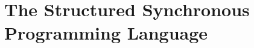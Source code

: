 

\section{The Structured Synchronous Programming Language \CEU}
\label{sec.ceu}

\begin{comment}
- structured programming
- lexical scope

In summary:

Reactive: code executes in reactions to events

Synchronous: reactions run to completion, i.e., there's no implicit preemption or real parallelism (this avoids explicit synchronization: locks, queues, etc)

Structured: programs use structured control mechanisms, such as "await" (to suspend a line of execution), and "par" (to combine multiple awaiting lines of execution)

Structured programming avoids deep nesting of callbacks letting you write programs in direct/sequential style. In addition, when a line of execution is aborted, all allocated resources are safely released.

In comparison to FRP/dataflow, it is more imperative supporting sequences/loops/conditionals/parallels. The notion of (multiple) program counter is explicit. Also, everything is lexically scoped, there's no GC involved.

In comparison to promises/futures, it provides lexical parallel constructs, allowing the branches to share local variables and, more importantly, supporting safe abortion of code (with the "par/or").
\end{comment}

